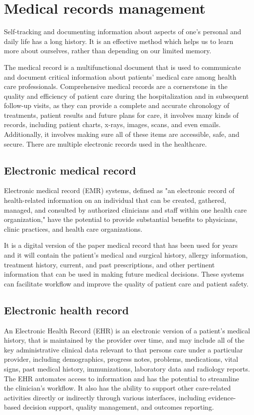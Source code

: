 \section{Medical records management}
Self-tracking and documenting information about aspects of one’s personal and daily life has a long history. It is an effective method which helps us to learn more about ourselves, rather than depending on our limited memory\cite{alrehielyEvaluatingDifferentVisualization}.


The medical record is a multifunctional document that is used to communicate and document critical information about patients’ medical care among health care professionals. Comprehensive medical records are a cornerstone in the quality and efficiency of patient care during the hospitalization and in subsequent follow-up visits, as they can provide a complete and accurate chronology of treatments, patient results and future plans for care\cite{wong2009developing}, it involves many kinds of records, including patient charts, x-rays, images, scans, and even emails. Additionally, it involves making sure all of these items are accessible, safe, and secure.
There are multiple electronic records used in the healthcare.
\subsection{Electronic medical record}
Electronic medical record (EMR) systems, defined as "an electronic record of health-related information on an individual that can be created, gathered, managed, and consulted by authorized clinicians and staff within one health care organization,"  have the potential to provide substantial benefits to physicians, clinic practices, and health care organizations. 

It  is a digital version of the paper medical record that has been used for years and it will contain the patient’s medical and surgical history, allergy information, treatment history, current, and past prescriptions, and other pertinent information that can be used in making future medical decisions\cite{WheelWhatAre}. These systems can facilitate workflow and improve the quality of patient care and patient safety\cite{ElectronicMedicalRecord}.

\subsection{Electronic health record}
An Electronic Health Record (EHR) is an electronic version of a patient's medical history, that is maintained by the provider over time, and may include all of the key administrative clinical data relevant to that persons care under a particular provider, including demographics, progress notes, problems, medications, vital signs, past medical history, immunizations, laboratory data and radiology reports. The EHR automates access to information and has the potential to streamline the clinician's workflow.  It also has the ability to support other care-related activities directly or indirectly through various interfaces, including evidence-based decision support, quality management, and outcomes reporting. 
 
